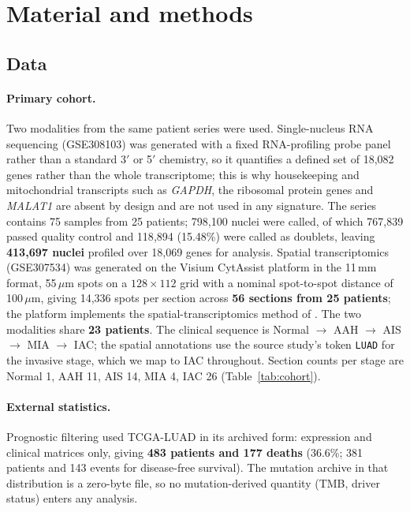 \section{Material and methods}

\subsection{Data}

\paragraph{Primary cohort.} Two modalities from the same patient series were used.
Single-nucleus RNA sequencing (GSE308103) was generated with a fixed RNA-profiling probe
panel rather than a standard 3$'$ or 5$'$ chemistry, so it quantifies a defined set of
18{,}082 genes rather than the whole transcriptome; this is why housekeeping and
mitochondrial transcripts such as \emph{GAPDH}, the ribosomal protein genes and
\emph{MALAT1} are absent by design and are not used in any signature. The series contains
75 samples from 25 patients; 798{,}100 nuclei were called, of which 767{,}839 passed
quality control and 118{,}894 (15.48\%) were called as doublets, leaving
\textbf{413{,}697 nuclei} profiled over 18{,}069 genes for analysis.
Spatial transcriptomics (GSE307534) was generated on the Visium CytAssist platform in the
11\,mm format, 55\,$\mu$m spots on a $128\times112$ grid with a nominal spot-to-spot
distance of 100\,$\mu$m, giving 14{,}336 spots per section across \textbf{56 sections from
25 patients}; the platform implements the spatial-transcriptomics method of
\citet{stahl2016}. The two modalities share \textbf{23 patients}. The clinical sequence is
Normal $\rightarrow$ AAH $\rightarrow$ AIS $\rightarrow$ MIA $\rightarrow$ IAC; the spatial
annotations use the source study's token \texttt{LUAD} for the invasive stage, which we map
to IAC throughout. Section counts per stage are Normal 1, AAH 11, AIS 14, MIA 4, IAC 26
(Table~\ref{tab:cohort}).

\paragraph{External statistics.} Prognostic filtering used TCGA-LUAD
\citep{tcga2014luad} in its archived form: expression and clinical matrices only, giving
\textbf{483 patients and 177 deaths} (36.6\%; 381 patients and 143 events for disease-free
survival). The mutation archive in that distribution is a zero-byte file, so no
mutation-derived quantity (TMB, driver status) enters any analysis.

